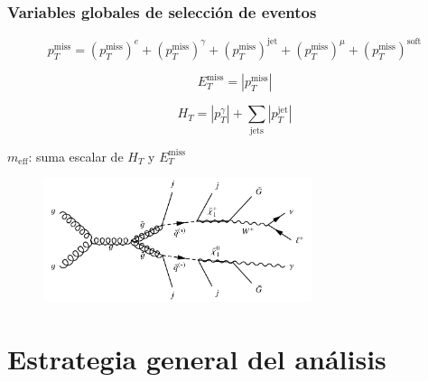 \documentclass[10pt, compress,spanish]{beamer}
\begin{document}
\begin{frame}[fragile]

\frametitle{Variables globales de selección de eventos}

\scriptsize


\begin{equation*}
p_{T}^{\text{miss}}=\left(p_{T}^{\text{miss}}\right)^{e} + \left(p_{T}^{\text{miss}}\right)^{\gamma} + \left(p_{T}^{\text{miss}}\right)^{\text{jet}} +\left(p_{T}^{\text{miss}}\right)^{\mu} + \left(p_{T}^{\text{miss}}\right)^{\text{soft}}
\end{equation*}

\begin{equation*}
E_{T}^{\text{miss}}=|p_{T}^{\text{miss}}|
\end{equation*}


\begin{equation*}
H_{T}=|p_{T}^{\gamma}|+\sum_{\text{jets}}|p_{T}^{\text{jet}}|
\end{equation*}


\centering 
$m_{\text{eff}}$: suma escalar de $H_{T}$ y $E_{T}^{\text{miss}}$



\hrulefill

\begin{figure}
\includegraphics[width=0.7\textwidth]{feyn.png}
\end{figure}

\end{frame}





\section{Estrategia general del análisis}
\end{document}
